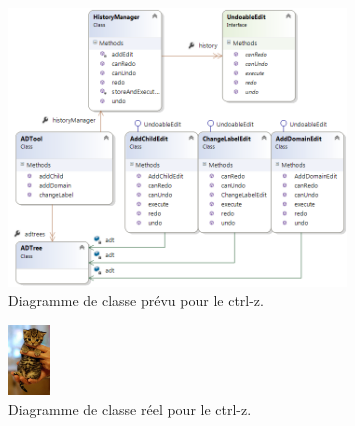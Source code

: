         \begin{figure}[H]
            \centering
                \includegraphics[width=0.8\textwidth]{figure/ctrlz.png}
            \caption{Diagramme de classe prévu pour le ctrl-z.}
            \label{fig:ctrlzPrevu}
        \end{figure}
        
        \begin{figure}[H]
            \centering
                \includegraphics[width=0.1\textwidth]{figure/liste.png}
            \caption{Diagramme de classe réel pour le ctrl-z.}
            \label{fig:ctrlzReel}
        \end{figure}

\newpage
\newpage